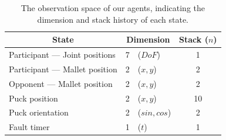 \documentclass{article}
\begin{document}
\begin{table}[ht]
    \caption{The observation space of our agents, indicating the dimension and stack history of each state.}
    \label{tab:observation-space}
    \centering
    \begin{tabular}{lclc}
        \toprule
        \multicolumn{1}{c}{State}                 & \multicolumn{2}{c}{Dimension} & Stack (\(n\))                                   \\
        \midrule
        Participant --- Joint positions           & \hspace{1pt} 7 \hspace{-7pt}  & \hspace{-7pt} (\(DoF\))      & \hspace{1pt} 1   \\
        Participant --- Mallet position           & \hspace{1pt} 2 \hspace{-7pt}  & \hspace{-7pt} (\(x, y\))     & \hspace{1pt} 2   \\
        Opponent \hspace{1pt} --- Mallet position & \hspace{1pt} 2 \hspace{-7pt}  & \hspace{-7pt} (\(x, y\))     & \hspace{1pt} 2   \\
        Puck position                             & \hspace{1pt} 2 \hspace{-7pt}  & \hspace{-7pt} (\(x, y\))     & 10 \hspace{-1pt} \\
        Puck orientation                          & \hspace{1pt} 2 \hspace{-7pt}  & \hspace{-7pt} (\(sin, cos\)) & \hspace{1pt} 2   \\
        Fault timer                               & \hspace{1pt} 1 \hspace{-7pt}  & \hspace{-7pt} (\(t\))        & \hspace{1pt} 1   \\
        \bottomrule
    \end{tabular}
\end{table}
\end{document}
